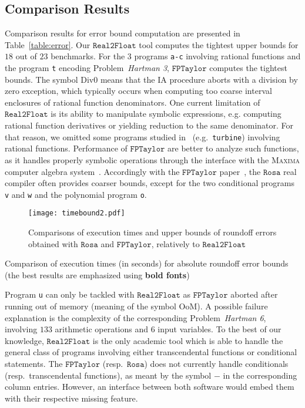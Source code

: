 \documentclass[preprint,fleqn,nocopyrightspace]{sigplanconf}
\newcommand{\code}[1]{\lstinline{#1}}
\newcommand{\nbenchs}{23}
\newcommand{\divzero}{\text{Div0}}
\newcommand{\realtofloat}{\mathtt{Real2Float}}
\newcommand{\rosa}{\mathtt{Rosa}}
\newcommand{\fptaylor}{\mathtt{FPTaylor}}
\theoremstyle{plain}
\begin{document}
\subsection{Comparison Results}
%
Comparison results for error bound computation are presented in Table~\ref{table:error}. 
%
Our $\realtofloat$ tool computes the tightest upper bounds for $18$ out of $\nbenchs$ benchmarks. For the $3$ programs \code{a-c} involving rational functions and the program \code{t} encoding Problem~\textit{Hartman 3}, $\fptaylor$ computes the tightest bounds. The symbol $\divzero$ means that the IA procedure aborts with a division by zero exception, which typically occurs when computing too coarse interval enclosures of rational function denominators.
One current limitation of $\realtofloat$ is its ability to manipulate symbolic expressions, e.g. computing rational function derivatives or yielding reduction to the same denominator. For that reason, we omitted some programs studied in~\cite{fptaylor15} (e.g.~\code{turbine}) involving rational functions.
Performance of $\fptaylor$ are better to analyze such functions, as it handles properly symbolic operations through the interface with the \textsc{Maxima} computer algebra system~\cite{maxima}.
Accordingly with the $\fptaylor$ paper~\cite{fptaylor15}, the $\rosa$ real compiler often provides coarser bounds, except for the two conditional programs \code{v} and \code{w} and the polynomial program \code{o}.
%
\begin{figure}[!ht]
\begin{center}
\texttt{[image: timebound2.pdf]}
\caption{Comparisons of execution times and upper bounds of roundoff errors obtained with $\rosa$ and $\fptaylor$, relatively to $\realtofloat$}\label{fig:timebound}
\end{center}
\end{figure}
%
\begin{table}[!ht]
\begin{center}
\caption{Comparison of execution times (in seconds) for absolute roundoff error bounds (the best results are emphasized using \textbf{bold fonts})}

\label{table:cpu}
\end{center}
\end{table}
%
Program \code{u} can only be tackled with $\realtofloat$ as $\fptaylor$ aborted after running out of memory (meaning of the symbol OoM). A possible failure explanation is the complexity of the corresponding Problem~\textit{Hartman 6}, involving $133$ arithmetic operations and $6$ input variables.
To the best of our knowledge, $\realtofloat$ is the only academic tool which is able to handle the general class of programs involving either transcendental functions or conditional statements. The $\fptaylor$ (resp.~$\rosa$) does not currently handle conditionals (resp.~transcendental functions), as meant by the symbol $-$ in the corresponding column entries. However, an interface between both software would embed them with their respective missing feature.
\end{document}
